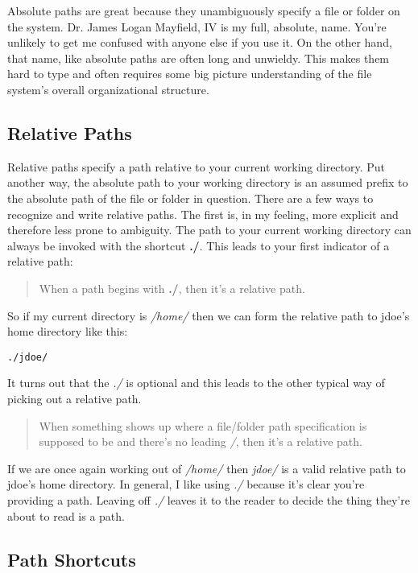 \documentclass[]{tufte-handout}
\begin{document}
Absolute paths are great because they unambiguously specify a file or folder on the system. Dr. James Logan Mayfield, IV is my full, absolute, name. You're unlikely to get me confused with anyone else if you use it. On the other hand, that name, like absolute paths are often long and unwieldy. This makes them hard to type and often requires some big picture understanding of the file system's overall organizational structure.  

\subsection{Relative Paths}

Relative paths specify a path relative to your current working directory. Put another way, the absolute path to your working directory is an assumed prefix to the absolute path of the file or folder in question.  There are a few ways to recognize and write relative paths.  The first is, in my feeling, more explicit and therefore less prone to ambiguity. The path to your current working directory can always be invoked with the shortcut \textbf{./}. This leads to your first indicator of a relative path:
\begin{quote}
When a path begins with \textbf{./}, then it's a relative path.
\end{quote}
So if my current directory is \textit{/home/} then we can form the relative path to jdoe's home directory like this:
\begin{verbatim}
./jdoe/
\end{verbatim}
It turns out that the \textit{./} is optional and this leads to the other typical way of picking out a relative path.
\begin{quote}
When something shows up where a file/folder path specification is supposed to be and there's no leading \textit{/}, then it's a relative path.
\end{quote}
If we are once again working out of \textit{/home/} then \textit{jdoe/} is a valid relative path to jdoe's home directory.  In general, I like using \textit{./} because it's clear you're providing a path. Leaving off \textit{./} leaves it to the reader to decide the thing they're about to read is a path.

\subsection{Path Shortcuts}
\end{document}
